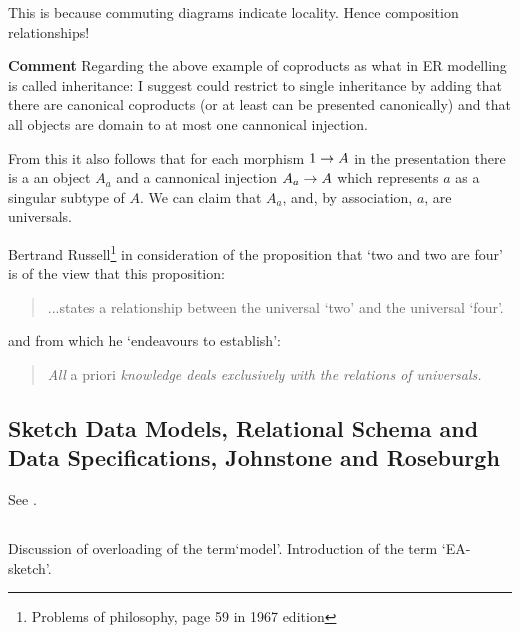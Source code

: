 \documentclass[10pt,a4paper]{scrartcl}
\begin{document}
This is because commuting diagrams indicate locality. Hence composition relationships!

\textbf{Comment}
Regarding the above example of coproducts as what in ER modelling is called inheritance: I suggest could restrict to single inheritance by adding that
there are canonical coproducts (or at least can be presented canonically) and that all objects are domain to at most
one cannonical injection. 

From this it also follows that for each  morphism $1 \rightarrow A$ in the presentation there is a an object
$A_a$ and a cannonical injection $A_a \rightarrow A$ which represents $a$ as a singular subtype of $A$. We can claim that
$A_a$, and, by association, $a$, are universals. 

Bertrand Russell\footnote{Problems of philosophy, page 59 in 1967 edition} in consideration of the proposition
that `two and two are four' is of the view that this proposition:
\begin{quote}
...states a relationship between the universal `two' and the universal `four'.
\end{quote}
and from which he `endeavours to establish':
\begin{quote}
\textit{All} a priori \textit{knowledge deals exclusively with the relations of universals.}
\end{quote}

\subsection{Sketch Data Models, Relational Schema and Data Specifications, Johnstone and Roseburgh }
See \cite{johnson2002REL}.



\subsection{\cite{Johnson2002ERA} }
Discussion of overloading of the term`model'.
Introduction of the term `EA-sketch'. 
\end{document}
